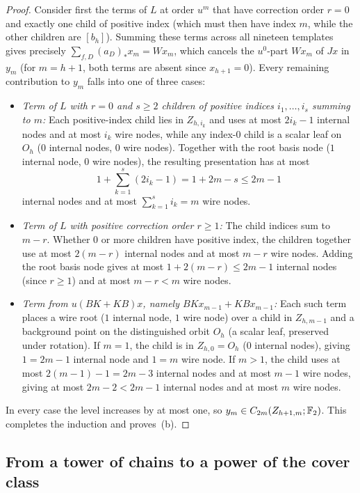 \begin{proof}
Consider first the terms of $L$ at order $u^m$ that have correction order $r=0$ and exactly one child of positive index (which must then have index $m$, while the other children are $[b_h]$). Summing these terms across all nineteen templates gives precisely $\sum_{f,D}(a_D)_* x_m=Wx_m$, which cancels the $u^0$-part $Wx_m$ of $Jx$ in $y_m$ (for $m=h+1$, both terms are absent since $x_{h+1}=0$). Every remaining contribution to $y_m$ falls into one of three cases:
\begin{itemize}
\item \emph{Term of $L$ with $r=0$ and $s\ge2$ children of positive indices $i_1,\ldots,i_s$ summing to $m$:} Each positive-index child lies in $Z_{h,i_k}$ and uses at most $2i_k-1$ internal nodes and at most $i_k$ wire nodes, while any index-$0$ child is a scalar leaf on $O_h$ ($0$ internal nodes, $0$ wire nodes). Together with the root basis node ($1$ internal node, $0$ wire nodes), the resulting presentation has at most
\[
 1+\sum_{k=1}^s (2i_k-1)=1+2m-s\le 2m-1
\]
internal nodes and at most $\sum_{k=1}^s i_k=m$ wire nodes.
\item \emph{Term of $L$ with positive correction order $r\ge1$:} The child indices sum to $m-r$. Whether $0$ or more children have positive index, the children together use at most $2(m-r)$ internal nodes and at most $m-r$ wire nodes. Adding the root basis node gives at most $1+2(m-r)\le 2m-1$ internal nodes (since $r\ge1$) and at most $m-r<m$ wire nodes.
\item \emph{Term from $u(BK+KB)x$, namely $BKx_{m-1}+KBx_{m-1}$:} Each such term places a wire root ($1$ internal node, $1$ wire node) over a child in $Z_{h,m-1}$ and a background point on the distinguished orbit $O_h$ (a scalar leaf, preserved under rotation). If $m=1$, the child is in $Z_{h,0}=O_h$ ($0$ internal nodes), giving $1=2m-1$ internal node and $1=m$ wire node. If $m>1$, the child uses at most $2(m-1)-1=2m-3$ internal nodes and at most $m-1$ wire nodes, giving at most $2m-2<2m-1$ internal nodes and at most $m$ wire nodes.
\end{itemize}
In every case the level increases by at most one, so $y_m\in C_{2m}(Z_{h+1,m};\mathbb F_2)$. This completes the induction and proves~(b).
\end{proof}

\subsection{From a tower of chains to a power of the cover class}\label{app:tower-det}

